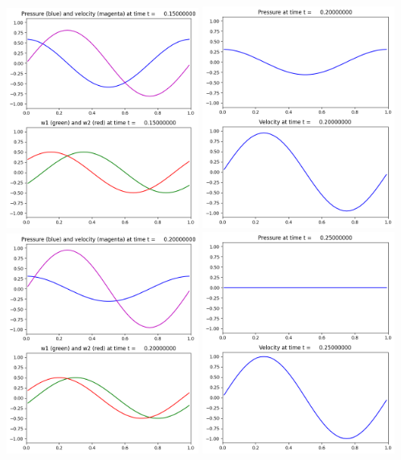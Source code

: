 \documentclass[11pt]{article}
\begin{document}
\includegraphics[width=0.475\textwidth]{frame0003fig2.png}
\vskip 10pt 
\includegraphics[width=0.475\textwidth]{frame0004fig1.png}
\includegraphics[width=0.475\textwidth]{frame0004fig2.png}
\vskip 10pt 
\includegraphics[width=0.475\textwidth]{frame0005fig1.png}
\end{document}
